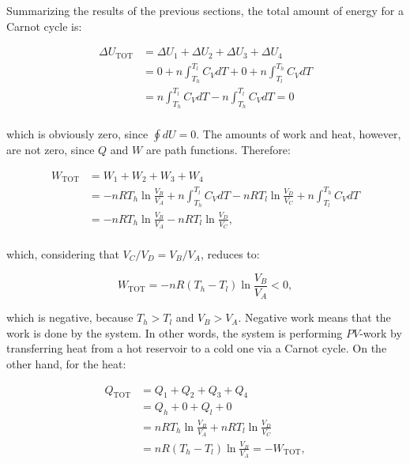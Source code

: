 \documentclass[
  9pt,
]{extbook}
\theoremstyle{definition}
\theoremstyle{definition}
\theoremstyle{definition}
\theoremstyle{remark}
\begin{document}
Summarizing the results of the previous sections, the total amount of energy for a Carnot cycle is:

\begin{equation}
\begin{aligned}
  \Delta U_{\text{TOT}} & = \Delta U_1+\Delta U_2+\Delta U_3+\Delta U_4 \\
                 & = 0 + n \int_{T_h}^{T_l} C_V dT + 0 + n \int_{T_l}^{T_h} C_V dT  \\
                 & = n \int_{T_h}^{T_l} C_V dT - n \int_{T_h}^{T_l} C_V dT = 0 \\
\end{aligned}
  \label{eq:UtotCC}
\end{equation}

which is obviously zero, since \(\oint dU=0\). The amounts of work and heat, however, are not zero, since \(Q\) and \(W\) are path functions. Therefore:

\begin{equation}
\begin{aligned}
  W_{\text{TOT}} & = W_1+W_2+W_3+W_4 \\
                 & = - nRT_h \ln \frac{V_B}{V_A} + n \int_{T_h}^{T_l} C_V dT - nRT_l \ln \frac{V_D}{V_C} + n \int_{T_l}^{T_h} C_V dT \\
                 & = - nRT_h \ln \frac{V_B}{V_A} - nRT_l \ln \frac{V_D}{V_C}, \\
\end{aligned}
  \label{eq:WtotCC}
\end{equation}

which, considering that \(V_C/V_D=V_B/V_A\), reduces to:

\begin{equation}
  W_{\text{TOT}} = - nR \left( T_h-T_l \right) \ln \frac{V_B}{V_A} < 0,
  \label{eq:WtotCC2}
\end{equation}

which is negative, because \(T_h>T_l\) and \(V_B>V_A\). Negative work means that the work is done by the system. In other words, the system is performing \(PV\)-work by transferring heat from a hot reservoir to a cold one via a Carnot cycle. On the other hand, for the heat:

\begin{equation}
\begin{aligned}
  Q_{\text{TOT}} & = Q_1+Q_2+Q_3+Q_4 \\
                 & = Q_h + 0 + Q_l + 0    \\
                 & = nRT_h \ln \frac{V_B}{V_A} + nRT_l \ln \frac{V_D}{V_C} \\
                 & = nR \left( T_h-T_l \right) \ln \frac{V_B}{V_A} = -W_{\text{TOT}},
\end{aligned}
  \label{eq:QtotCC}
\end{equation}
\end{document}
